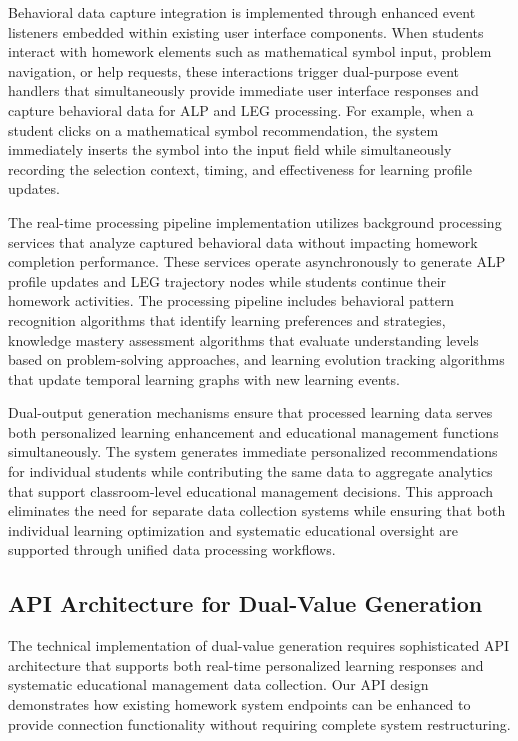\documentclass[conference]{IEEEtran}
\begin{document}
\begin{IEEEkeywords}
Behavioral data capture integration is implemented through enhanced event listeners embedded within existing user interface components. When students interact with homework elements such as mathematical symbol input, problem navigation, or help requests, these interactions trigger dual-purpose event handlers that simultaneously provide immediate user interface responses and capture behavioral data for ALP and LEG processing. For example, when a student clicks on a mathematical symbol recommendation, the system immediately inserts the symbol into the input field while simultaneously recording the selection context, timing, and effectiveness for learning profile updates.

The real-time processing pipeline implementation utilizes background processing services that analyze captured behavioral data without impacting homework completion performance. These services operate asynchronously to generate ALP profile updates and LEG trajectory nodes while students continue their homework activities. The processing pipeline includes behavioral pattern recognition algorithms that identify learning preferences and strategies, knowledge mastery assessment algorithms that evaluate understanding levels based on problem-solving approaches, and learning evolution tracking algorithms that update temporal learning graphs with new learning events.

Dual-output generation mechanisms ensure that processed learning data serves both personalized learning enhancement and educational management functions simultaneously. The system generates immediate personalized recommendations for individual students while contributing the same data to aggregate analytics that support classroom-level educational management decisions. This approach eliminates the need for separate data collection systems while ensuring that both individual learning optimization and systematic educational oversight are supported through unified data processing workflows.

\subsection{API Architecture for Dual-Value Generation}

The technical implementation of dual-value generation requires sophisticated API architecture that supports both real-time personalized learning responses and systematic educational management data collection. Our API design demonstrates how existing homework system endpoints can be enhanced to provide connection functionality without requiring complete system restructuring.


\end{IEEEkeywords}
\end{document}

